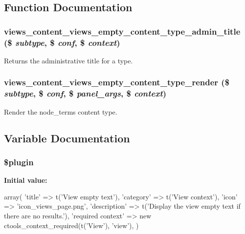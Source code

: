 \subsection{Function Documentation}
\hypertarget{views__empty_8inc_a29ded606f108650610541efca6dda275}{
\subsubsection[{views\_\-content\_\-views\_\-empty\_\-content\_\-type\_\-admin\_\-title}]{\setlength{\rightskip}{0pt plus 5cm}views\_\-content\_\-views\_\-empty\_\-content\_\-type\_\-admin\_\-title (\$ {\em subtype}, \/  \$ {\em conf}, \/  \$ {\em context})}}
\label{views__empty_8inc_a29ded606f108650610541efca6dda275}
Returns the administrative title for a type. \hypertarget{views__empty_8inc_ae4a5f1ba3896fe55d9ffab3e59c89eeb}{
\subsubsection[{views\_\-content\_\-views\_\-empty\_\-content\_\-type\_\-render}]{\setlength{\rightskip}{0pt plus 5cm}views\_\-content\_\-views\_\-empty\_\-content\_\-type\_\-render (\$ {\em subtype}, \/  \$ {\em conf}, \/  \$ {\em panel\_\-args}, \/  \$ {\em context})}}
\label{views__empty_8inc_ae4a5f1ba3896fe55d9ffab3e59c89eeb}
Render the node\_\-terms content type. 

\subsection{Variable Documentation}
\hypertarget{views__empty_8inc_ada8a7130088351710bb02ed622d6bf65}{
\subsubsection[{\$plugin}]{\setlength{\rightskip}{0pt plus 5cm}\$plugin}}
\label{views__empty_8inc_ada8a7130088351710bb02ed622d6bf65}
{\bfseries Initial value:}
\begin{DoxyCode}
 array(
  'title' => t('View empty text'),
  'category' => t('View context'),
  'icon' => 'icon_views_page.png',
  'description' => t('Display the view empty text if there are no results.'),
  'required context' => new ctools_context_required(t('View'), 'view'),
)
\end{DoxyCode}
